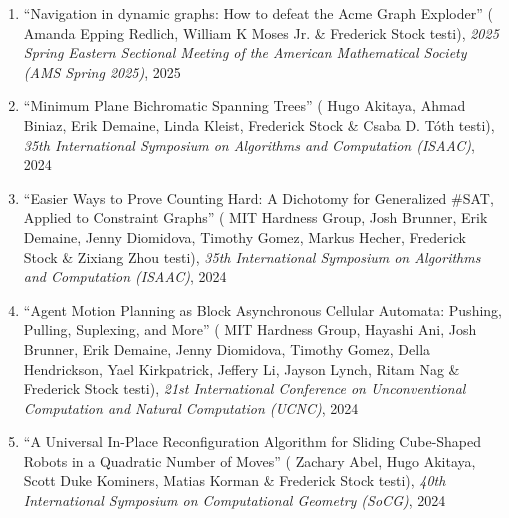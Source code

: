 \documentclass[letterpaper,11pt]{article}
\makeatletter
\newcommand{\publication}[6]{
  \item ``#1'' %
   (\ignorespaces#2 testi), %
     \emph{#3}, %
      #4%


}
\newcommand{\pdficon}{\faFilePdf}
\newcommand{\doilabel}{\texttt{DOI}}
\makeatother
\begin{document}
\begin{enumerate}
        \publication
          {Navigation in dynamic graphs: How to defeat the Acme Graph Exploder}
          {
 Amanda Epping Redlich, William K Moses Jr. \& Frederick Stock}
          {2025 Spring Eastern Sectional Meeting of the American Mathematical Society (AMS Spring 2025)}
          {2025}
          {%
%
%
%
          }
          {6}
 \vspace{-.5em}  
      
        \publication
          {Minimum Plane Bichromatic Spanning Trees}
          {
 Hugo Akitaya, Ahmad Biniaz, Erik Demaine, Linda Kleist, Frederick Stock \& Csaba D. Tóth}
          {35th International Symposium on Algorithms and Computation (ISAAC)}
          {2024}
          {%
\href{fred-stock.github.io/docstore/MPBST-ISAAC.pdf}{\pdficon}%
%
\quad\href{https://doi.org/10.4230/LIPIcs.ISAAC.2024.4}{\doilabel}%
          }
          {7}
 \vspace{-.5em}  
      
        \publication
          {Easier Ways to Prove Counting Hard: A Dichotomy for Generalized \#SAT, Applied to Constraint Graphs}
          {
 MIT Hardness Group, Josh Brunner, Erik Demaine, Jenny Diomidova, Timothy Gomez, Markus Hecher, Frederick Stock \& Zixiang Zhou}
          {35th International Symposium on Algorithms and Computation (ISAAC)}
          {2024}
          {%
\href{fred-stock.github.io/docstore/Easier-Ways-Hard-Counting-ISAAC.pdf}{\pdficon}%
%
\quad\href{https://doi.org/10.4230/LIPIcs.ISAAC.2024.51}{\doilabel}%
          }
          {8}
 \vspace{-.5em}  
      
        \publication
          {Agent Motion Planning as Block Asynchronous Cellular Automata: Pushing, Pulling, Suplexing, and More}
          {
 MIT Hardness Group, Hayashi Ani, Josh Brunner, Erik Demaine, Jenny Diomidova, Timothy Gomez, Della Hendrickson, Yael Kirkpatrick, Jeffery Li, Jayson Lynch, Ritam Nag \& Frederick Stock}
          {21st International Conference on Unconventional Computation and Natural Computation (UCNC)}
          {2024}
          {%
\href{fred-stock.github.io/docstore/Block-Pushing-UCNC.pdf}{\pdficon}%
%
\quad\href{https://doi.org/10.1007/978-3-031-63742-1_16}{\doilabel}%
          }
          {9}
 \vspace{-.5em}  
      
        \publication
          {A Universal In-Place Reconfiguration Algorithm for Sliding Cube-Shaped Robots in a Quadratic Number of Moves}
          {
 Zachary Abel, Hugo Akitaya, Scott Duke Kominers, Matias Korman \& Frederick Stock}
          {40th International Symposium on Computational Geometry (SoCG)}
          {2024}
          {%
\href{fred-stock.github.io/docstore/Universal-In-Place-Sliding-Cubes-SOCG.pdf}{\pdficon}%
%
\quad\href{https://doi.org/10.4230/LIPIcs.SoCG.2024.1}{\doilabel}%
          }
          {10}
 \vspace{-.5em}  
      

\end{enumerate}
\end{document}
